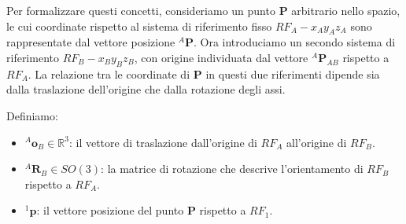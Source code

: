 ﻿\documentclass[11pt, a4paper]{article}
\begin{document}
\begin{center}
\end{center}
Per formalizzare questi concetti, consideriamo un punto \textbf{P} arbitrario nello spazio, le cui coordinate rispetto al sistema di riferimento fisso $RF_{A} - x_{A}y_{A}z_{A}$ sono rappresentate dal vettore posizione $^{A}\mathbf{P}$. Ora introduciamo un secondo sistema di riferimento $RF_{B} - x_{B}y_{B}z_{B}$, con origine individuata dal vettore $^{A}\mathbf{P}_{AB}$ rispetto a $RF_{A}$. La relazione tra le coordinate di \textbf{P} in questi due riferimenti dipende sia dalla traslazione dell'origine che dalla rotazione degli assi.

Definiamo:
\begin{itemize}
    \item $^{A}\mathbf{o}_{B} \in \mathbb{R}^{3}$: il vettore di traslazione dall'origine di $RF_{A}$ all'origine di $RF_{B}$.
    \item $^{A}\mathbf{R}_{B} \in SO(3)$: la matrice di rotazione che descrive l'orientamento di $RF_{B}$ rispetto a $RF_{A}$.
    \item $^{1}\mathbf{p}$: il vettore posizione del punto \textbf{P} rispetto a $RF_{1}$.
\end{itemize}
\end{document}

